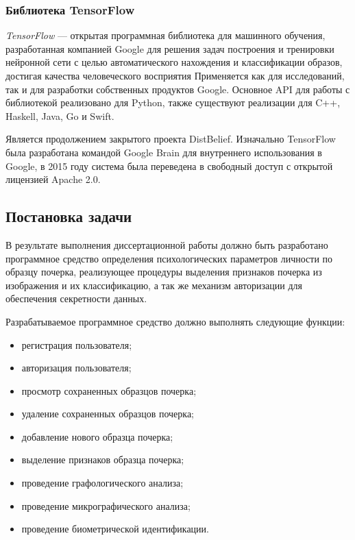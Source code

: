 \subsubsection{Библиотека TensorFlow}
\label{sec:techs:tensor_flow}
\emph{TensorFlow} — открытая программная библиотека для машинного обучения, разработанная компанией Google для решения задач построения и тренировки нейронной сети с целью автоматического нахождения и классификации образов, достигая качества человеческого восприятия Применяется как для исследований, так и для разработки собственных продуктов Google. Основное API для работы с библиотекой реализовано для Python, также существуют реализации для C++, Haskell, Java, Go и Swift.

Является продолжением закрытого проекта DistBelief. Изначально TensorFlow была разработана командой Google Brain для внутреннего использования в Google, в 2015 году система была переведена в свободный доступ с открытой лицензией Apache 2.0.

\subsection{Постановка задачи}
\label{sec:domain:requirements}
В результате выполнения диссертационной работы должно быть разработано программное средство определения психологических параметров личности по образцу почерка, реализующее процедуры выделения признаков почерка из изображения и их классификацию, а так же механизм авторизации для обеспечения секретности данных.

Разрабатываемое программное средство должно выполнять следующие функции:
\begin{itemize}
  \item регистрация пользователя;
  \item авторизация пользователя;
  \item просмотр сохраненных образцов почерка;
  \item удаление сохраненных образцов почерка;
  \item добавление нового образца почерка;
  \item выделение признаков образца почерка;
  \item проведение графологического анализа;
  \item проведение микрографического анализа;
  \item проведение биометрической идентификации.
\end{itemize}

